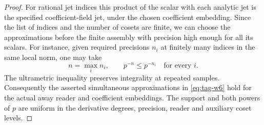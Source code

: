\begin{proof}
For rational jet indices this product
of the scalar with each analytic jet is the
specified coefficient-field jet, under the
chosen coefficient embedding. Since the list
of indices and the number of cosets are finite,
we can choose the approximations before the
finite assembly with precision high enough
for all its scalars.
For instance, given required precisions \(n_i\) at finitely many indices in the same local norm, one may take
\[
  n=\max_i n_i,\qquad p^{-n}\le p^{-n_i}\quad\text{for every }i .
\]
 The ultrametric inequality
preserves integrality at repeated samples.
Consequently the asserted simultaneous
approximations in \eqref{eq:tag-w6} hold for the actual
away reader and coefficient embeddings. The
support and both powers of \(p\) are uniform
in the derivative degrees, precision, reader
and auxiliary coset levels.
\end{proof}

